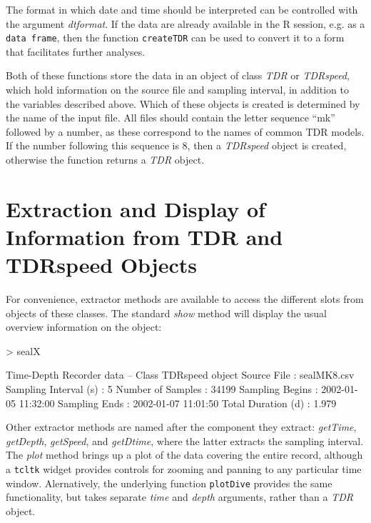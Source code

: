 \documentclass[12pt, letterpaper]{scrartcl}
\newcommand{\Robject}[1]{{\texttt{#1}}}
\newcommand{\Rfunction}[1]{{\texttt{#1}}}
\newcommand{\Rpackage}[1]{{\texttt{#1}}}
\newcommand{\Rclass}[1]{{\textit{#1}}}
\newcommand{\Rmethod}[1]{{\textit{#1}}}
\newcommand{\Rfunarg}[1]{{\textit{#1}}}
\newcommand{\R}{{\normalfont\textsf{R }}{}}
\begin{document}
The format in which date and time should be interpreted can be controlled
with the argument \Rfunarg{dtformat}.  If the data are already available
in the \R{} session, e.g. as a \Robject{data frame}, then the function
\Rfunction{createTDR} can be used to convert it to a form that facilitates
further analyses.

Both of these functions store the data in an object of class \Rclass{TDR}
or \Rclass{TDRspeed}, which hold information on the source file and
sampling interval, in addition to the variables described above.  Which of
these objects is created is determined by the name of the input file.  All
files should contain the letter sequence ``mk'' followed by a number, as
these correspond to the names of common TDR models.  If the number
following this sequence is 8, then a \Rclass{TDRspeed} object is created,
otherwise the function returns a \Rclass{TDR} object.


\section{Extraction and Display of Information from TDR and TDRspeed
  Objects}
\label{sec:extract}

For convenience, extractor methods are available to access the different
slots from objects of these classes.  The standard \Rmethod{show} method
will display the usual overview information on the object:
\begin{Schunk}
\begin{Sinput}
> sealX
\end{Sinput}
\begin{Soutput}
Time-Depth Recorder data -- Class TDRspeed object
  Source File             : sealMK8.csv 
  Sampling Interval (s)   : 5 
  Number of Samples       : 34199 
  Sampling Begins         : 2002-01-05 11:32:00 
  Sampling Ends           : 2002-01-07 11:01:50 
  Total Duration (d)      : 1.979 
\end{Soutput}
\end{Schunk}

Other extractor methods are named after the component they extract:
\Rmethod{getTime}, \Rmethod{getDepth}, \Rmethod{getSpeed}, and
\Rmethod{getDtime}, where the latter extracts the sampling interval.  The
\Rmethod{plot} method brings up a plot of the data covering the entire
record, although a \Rpackage{tcltk} widget provides controls for zooming
and panning to any particular time window.  Alernatively, the underlying
function \Rfunction{plotDive} provides the same functionality, but takes
separate \Rfunarg{time} and \Rfunarg{depth} arguments, rather than a
\Rclass{TDR} object.
\end{document}

